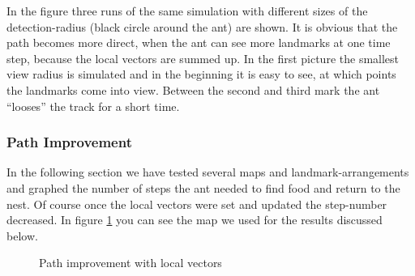 \documentclass[11pt]{article}
\begin{document}
In the figure three runs of the same simulation with different sizes of the detection-radius (black circle around the ant) are shown. It is obvious that the path becomes more direct, when the ant can see more landmarks at one time step, because the local vectors are summed up. In the first picture the smallest view radius is simulated and in the beginning it is easy to see, at which points the landmarks come into view. Between the second and third mark the ant “looses” the track for a short time.

\subsubsection{Path Improvement}
In the following section we have tested several maps and landmark-arrangements and graphed the number of steps the ant needed to find food and return to the nest. Of course once the local vectors were set and updated the step-number decreased. In figure \ref{maplocal} you can see the map we used for the results discussed below.
\begin{figure}
   \centering
\caption[Path improvement with local vectors]{Path improvement with local vectors}
\label{maplocal}
\end{figure}
\end{document}
